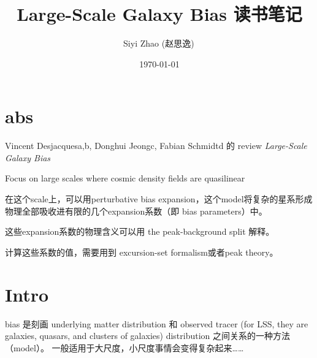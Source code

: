 \documentclass[10pt, a4paper]{ctexart}
\title{Large-Scale Galaxy Bias 读书笔记}
\author{Siyi Zhao (赵思逸)\,\orcidlink{0009-0001-4492-5158}}
\date{\today}
\begin{document}
\maketitle
\tableofcontents

\section*{abs}
Vincent Desjacquesa,b, Donghui Jeongc, Fabian Schmidtd 的 review  \textit{Large-Scale Galaxy Bias}

Focus on large scales where cosmic density fields are quasilinear 

在这个scale上，可以用perturbative bias expansion，这个model将复杂的星系形成物理全部吸收进有限的几个expansion系数（即 bias parameters）中。

这些expansion系数的物理含义可以用 the peak-background split 解释。

计算这些系数的值，需要用到 excursion-set formalism或者peak theory。

\section{Intro}

bias 是刻画 underlying matter distribution 和 observed tracer (for LSS, they are galaxies, quasars, and clusters of galaxies) distribution 之间关系的一种方法（model）。
一般适用于大尺度，小尺度事情会变得复杂起来……

% 
% 
\end{document}

